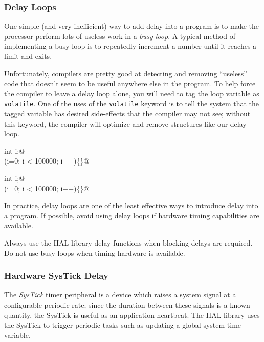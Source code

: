 \documentclass[openany,11pt,fleqn]{book} %
\begin{document}
\subsubsection{Delay Loops}
One simple (and very inefficient) way to add delay into a program is to make the processor perform lots of useless work in a \textit{busy loop}. A typical method of implementing a busy loop is to repeatedly increment a number until it reaches a limit and exits.

Unfortunately, compilers are pretty good at detecting and removing ``useless'' code that doesn't seem to be useful anywhere else in the program. To help force the compiler to leave a delay loop alone, you will need to tag the loop variable as \texttt{volatile}. One of the uses of the \texttt{volatile} keyword is to tell the system that the tagged variable has desired side-effects that the compiler may not see; without this keyword, the compiler will optimize and remove structures like our delay loop.

\colorbox{gray!20!white}{
    \centering
    \begin{minipage}{\linewidth}
        \lstinline@volatile int i;@ \\
        \lstinline@for(i=0; i < 100000; i++)\{\}@ 
    \end{minipage}
}

\smallskip
\colorbox{gray!20!white}{
    \centering
    \parbox{\linewidth-2\fboxsep}{
        \lstinline@volatile int i;@ \\
        \lstinline@for(i=0; i < 100000; i++)\{\}@ 
    }
}
\smallskip

In practice, delay loops are one of the least effective ways to introduce delay into a program. If possible, avoid using delay loops if hardware timing capabilities are available. 

\begin{warning}
    Always use the HAL library delay functions when blocking delays are required. Do not use busy-loops when timing hardware is available.
\end{warning}

\subsubsection{Hardware SysTick Delay}

The \textit{SysTick} timer peripheral is a device which raises a system signal at a configurable periodic rate; since the duration between these signals is a known quantity, the SysTick is useful as an application heartbeat. The HAL library uses the SysTick to trigger periodic tasks such as updating a global system time variable. 
\end{document}
